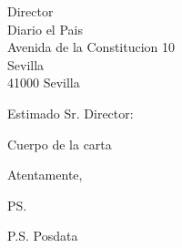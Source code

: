 \documentclass{letter}
\begin{document}
    
    \begin{letter}{Director \\ Diario el Pais \\ Avenida de la Constitucion 10
    \\ Sevilla \\ 41000 Sevilla}
    \opening{Estimado Sr. Director:}
    
    Cuerpo de la carta
    
    \closing{Atentamente,}
    
    \ps
    
    P.S. Posdata
    
    \end{letter}
    
\end{document}
